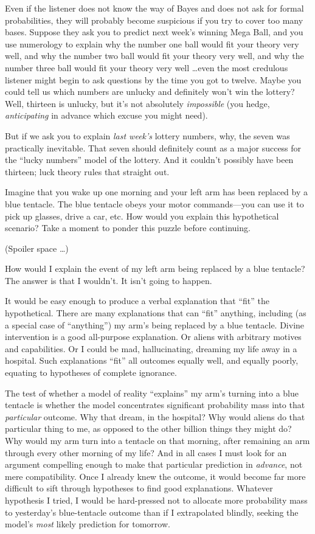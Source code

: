 {
 Even if the listener does not know the way of Bayes and does not
ask for formal probabilities, they will probably become suspicious if
you try to cover too many bases. Suppose they ask you to predict next
week's winning Mega Ball, and you use numerology to
explain why the number one ball would fit your theory very well, and
why the number two ball would fit your theory very well, and why the
number three ball would fit your theory very well \ldots even the most
credulous listener might begin to ask questions by the time you got to
twelve. Maybe you could tell us which numbers are unlucky and
definitely won't win the lottery? Well, thirteen is
unlucky, but it's not absolutely \textit{impossible}
(you hedge, \textit{anticipating} in advance which excuse you might
need).}

{
 But if we ask you to explain \textit{last week's}
lottery numbers, why, the seven was practically inevitable. That seven
should definitely count as a major success for the
``lucky numbers'' model of the
lottery. And it couldn't possibly have been thirteen;
luck theory rules that straight out.}

{
 Imagine that you wake up one morning and your left arm has been
replaced by a blue tentacle. The blue tentacle obeys your motor
commands---you can use it to pick up glasses, drive a car, etc. How
would you explain this hypothetical scenario? Take a moment to ponder
this puzzle before continuing.}

{
 (Spoiler space \ldots)}

{
 How would I explain the event of my left arm being replaced by a
blue tentacle? The answer is that I wouldn't. It
isn't going to happen.}

{
 It would be easy enough to produce a verbal explanation that
``fit'' the hypothetical. There are
many explanations that can ``fit''
anything, including (as a special case of
``anything'') my
arm's being replaced by a blue tentacle. Divine
intervention is a good all-purpose explanation. Or aliens with
arbitrary motives and capabilities. Or I could be mad, hallucinating,
dreaming my life away in a hospital. Such explanations
``fit'' all outcomes equally well,
and equally poorly, equating to hypotheses of complete ignorance.}

{
 The test of whether a model of reality
``explains'' my
arm's turning into a blue tentacle is whether the model
concentrates significant probability mass into that \textit{particular}
outcome. Why that dream, in the hospital? Why would aliens do that
particular thing to me, as opposed to the other billion things they
might do? Why would my arm turn into a tentacle on that morning, after
remaining an arm through every other morning of my life? And in all
cases I must look for an argument compelling enough to make that
particular prediction in \textit{advance}, not mere compatibility. Once
I already knew the outcome, it would become far more difficult to sift
through hypotheses to find good explanations. Whatever hypothesis I
tried, I would be hard-pressed not to allocate more probability mass to
yesterday's blue-tentacle outcome than if I
extrapolated blindly, seeking the model's \textit{most}
likely prediction for tomorrow.}


